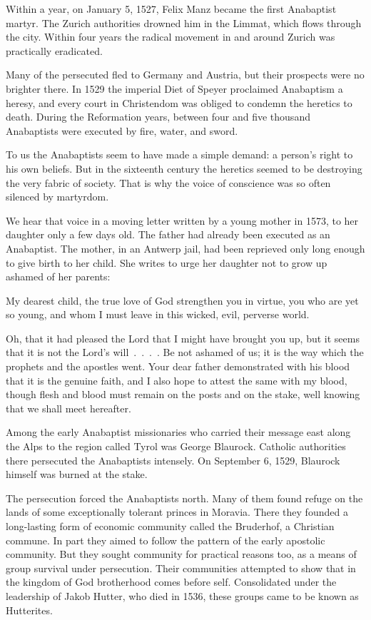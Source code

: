 Within a year, on January 5, 1527, Felix Manz became the first Anabaptist martyr. The Zurich
authorities drowned him in the Limmat, which flows through the city. Within four years the radical
movement in and around Zurich was practically eradicated.

Many of the persecuted fled to Germany and Austria, but their prospects were no brighter there. In
1529 the imperial Diet of Speyer proclaimed Anabaptism a heresy, and every court in Christendom was
obliged to condemn the heretics to death. During the Reformation years, between four and five
thousand Anabaptists were executed by fire, water, and sword.

To us the Anabaptists seem to have made a simple demand: a person’s right to his own beliefs. But in
the sixteenth century the heretics seemed to be destroying the very fabric of society. That is why
the voice of conscience was so often silenced by martyrdom.

We hear that voice in a moving letter written by a young mother in 1573, to her daughter only a few
days old. The father had already been executed as an Anabaptist. The mother, in an Antwerp jail, had
been reprieved only long enough to give birth to her child. She writes to urge her daughter not to
grow up ashamed of her parents:

\begin{blockquote}
My dearest child, the true love of God strengthen you in virtue, you who are yet so young, and whom
I must leave in this wicked, evil, perverse world.

Oh, that it had pleased the Lord that I might have brought you up, but it seems that it is not the
Lord’s will~.~.~.~. Be not ashamed of us; it is the way which the prophets and the apostles went.
Your dear father demonstrated with his blood that it is the genuine faith, and I also hope to attest
the same with my blood, though flesh and blood must remain on the posts and on the stake, well
knowing that we shall meet hereafter.
\end{blockquote}

Among the early Anabaptist missionaries who carried their message east along the Alps to the region
called Tyrol was George Blaurock. Catholic authorities there persecuted the Anabaptists intensely.
On September 6, 1529, Blaurock himself was burned at the stake.

The persecution forced the Anabaptists north. Many of them found refuge on the lands of some
exceptionally tolerant princes in Moravia. There they founded a long-lasting form of economic
community called the Bruderhof, a Christian commune. In part they aimed to follow the pattern of the
early apostolic community. But they sought community for practical reasons too, as a means of group
survival under persecution. Their communities attempted to show that in the kingdom of God
brotherhood comes before self. Consolidated under the leadership of Jakob Hutter, who died in 1536,
these groups came to be known as Hutterites.

